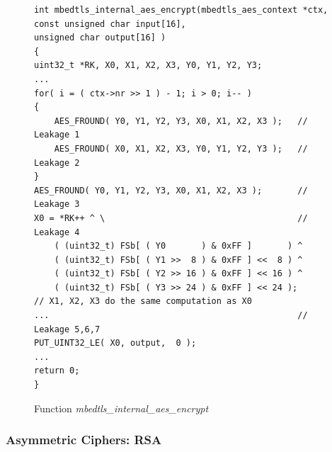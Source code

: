 \begin{figure}%
    \centering
    \begin{lstlisting}[frame=none]
int mbedtls_internal_aes_encrypt(mbedtls_aes_context *ctx,
const unsigned char input[16],
unsigned char output[16] )
{
uint32_t *RK, X0, X1, X2, X3, Y0, Y1, Y2, Y3;
...
for( i = ( ctx->nr >> 1 ) - 1; i > 0; i-- )
{
    AES_FROUND( Y0, Y1, Y2, Y3, X0, X1, X2, X3 );   // Leakage 1
    AES_FROUND( X0, X1, X2, X3, Y0, Y1, Y2, Y3 );   // Leakage 2
}
AES_FROUND( Y0, Y1, Y2, Y3, X0, X1, X2, X3 );       // Leakage 3
X0 = *RK++ ^ \                                      // Leakage 4
    ( (uint32_t) FSb[ ( Y0       ) & 0xFF ]       ) ^
    ( (uint32_t) FSb[ ( Y1 >>  8 ) & 0xFF ] <<  8 ) ^
    ( (uint32_t) FSb[ ( Y2 >> 16 ) & 0xFF ] << 16 ) ^
    ( (uint32_t) FSb[ ( Y3 >> 24 ) & 0xFF ] << 24 );
// X1, X2, X3 do the same computation as X0
...                                                 // Leakage 5,6,7
PUT_UINT32_LE( X0, output,  0 );
...
return 0;
}
\end{lstlisting}
    \caption{Function \textit{mbedtls\_internal\_aes\_encrypt}}
    \label{mbedtls_aes}
\end{figure}

\subsubsection{Asymmetric Ciphers: RSA}\label{eval:asym}

